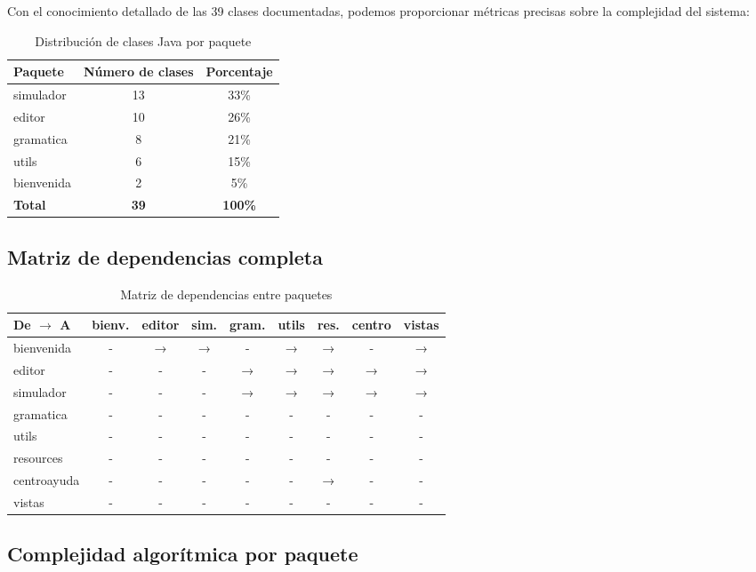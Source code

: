 Con el conocimiento detallado de las 39 clases documentadas, podemos proporcionar métricas precisas sobre la complejidad del sistema:

\begin{table}[H]
\centering
\caption{Distribución de clases Java por paquete}
\label{tab:distribucion-clases}
\begin{tabular}{|l|c|c|}
\hline
\textbf{Paquete} & \textbf{Número de clases} & \textbf{Porcentaje} \\
\hline
simulador & 13 & 33\% \\
editor & 10 & 26\% \\
gramatica & 8 & 21\% \\
utils & 6 & 15\% \\
bienvenida & 2 & 5\% \\
\hline
\textbf{Total} & \textbf{39} & \textbf{100\%} \\
\hline
\end{tabular}
\end{table}

\subsection{Matriz de dependencias completa}

\begin{table}[H]
\centering
\caption{Matriz de dependencias entre paquetes}
\label{tab:matriz-dependencias}
\begin{tabular}{|l|c|c|c|c|c|c|c|c|}
\hline
\textbf{De $\rightarrow$ A} & bienv. & editor & sim. & gram. & utils & res. & centro & vistas \\
\hline
\hline
bienvenida & - & → & → & - & → & → & - & → \\
editor & - & - & - & → & → & → & → & → \\
simulador & - & - & - & → & → & → & → & → \\
gramatica & - & - & - & - & - & - & - & - \\
utils & - & - & - & - & - & - & - & - \\
resources & - & - & - & - & - & - & - & - \\
centroayuda & - & - & - & - & - & → & - & - \\
vistas & - & - & - & - & - & - & - & - \\
\hline
\end{tabular}
\end{table}

\subsection{Complejidad algorítmica por paquete}

